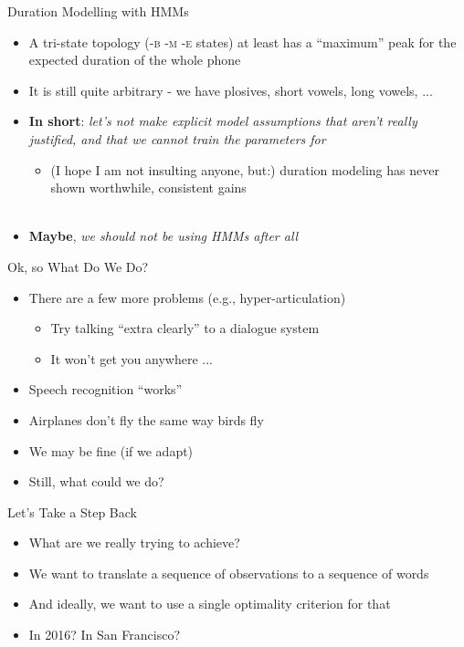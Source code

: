 \begin{frame}{Duration Modelling with HMMs}
  \begin{itemize}
  \item A tri-state topology (\textsc{-b -m -e} states) at least has a ``maximum'' peak for
    the expected duration of the whole phone
  \item It is still quite arbitrary - we have plosives, short vowels, long vowels, ...\\
    \hspace{1cm}
  \item \textbf{In short}: \textit{let's not make explicit model assumptions
    that aren't really justified, and that we cannot train the parameters for}
    \begin{itemize}
    \item (I hope I am not insulting anyone, but:) duration modeling has never shown
      worthwhile, consistent gains\\
      \hspace{1cm}\\
      \hspace{1cm}
    \end{itemize}
    \item \textbf{Maybe}, \textit{we should not be using HMMs after all}
  \end{itemize}
\end{frame}

\begin{frame}{Ok, so What Do We Do?}
  \begin{itemize}
  \item There are a few more problems (e.g., hyper-articulation)
    \begin{itemize}
    \item Try talking ``extra clearly'' to a dialogue system
    \item It won't get you anywhere ...
    \end{itemize}
  \item Speech recognition ``works''
  \item Airplanes don't fly the same way birds fly
  \item We may be fine (if we adapt)
  \item Still, what could we do?
  \end{itemize}
\end{frame}

\begin{frame}{Let's Take a Step Back}
  \begin{itemize}
  \item What are we really trying to achieve?
  \item We want to translate a sequence of observations to a sequence of words
  \item And ideally, we want to use a single optimality criterion for that
  \item In 2016? In San Francisco?
  \end{itemize}
\end{frame}

